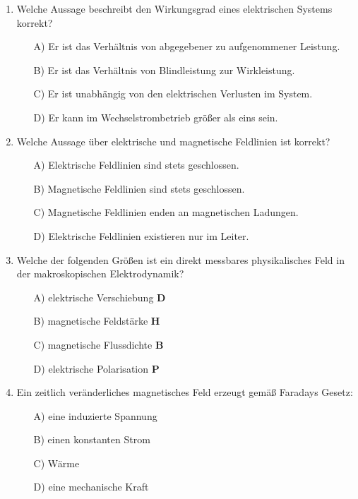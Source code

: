 \documentclass[a4paper,12pt]{article}
\newif\ifshowsolutions
\begin{document}
\begin{enumerate}[label=\textbf{\arabic*.}, leftmargin=*, itemsep=8pt]
\ifshowsolutions
Lösung: B
\fi

  \item Welche Aussage beschreibt den Wirkungsgrad eines elektrischen Systems korrekt?
    \begin{itemize}[label=$\square$]
      \item[A)] Er ist das Verhältnis von abgegebener zu aufgenommener Leistung.
      \item[B)] Er ist das Verhältnis von Blindleistung zur Wirkleistung.
      \item[C)] Er ist unabhängig von den elektrischen Verlusten im System.
      \item[D)] Er kann im Wechselstrombetrieb größer als eins sein.
    \end{itemize}

\ifshowsolutions
Lösung: A
\fi

  \item Welche Aussage über elektrische und magnetische Feldlinien ist korrekt?
    \begin{itemize}[label=$\square$]
      \item[A)] Elektrische Feldlinien sind stets geschlossen.
      \item[B)] Magnetische Feldlinien sind stets geschlossen.
      \item[C)] Magnetische Feldlinien enden an magnetischen Ladungen.
      \item[D)] Elektrische Feldlinien existieren nur im Leiter.
    \end{itemize}

\ifshowsolutions
Lösung: B
\fi

  \item Welche der folgenden Größen ist ein direkt messbares physikalisches Feld in der makroskopischen Elektrodynamik?
    \begin{itemize}[label=$\square$]
      \item[A)] elektrische Verschiebung \(\mathbf{D}\)
      \item[B)] magnetische Feldstärke \(\mathbf{H}\)
      \item[C)] magnetische Flussdichte \(\mathbf{B}\)
      \item[D)] elektrische Polarisation \(\mathbf{P}\)
    \end{itemize}

\ifshowsolutions
Lösung: C
\fi

  \item Ein zeitlich veränderliches magnetisches Feld erzeugt gemäß Faradays Gesetz:
    \begin{itemize}[label=$\square$]
      \item[A)] eine induzierte Spannung
      \item[B)] einen konstanten Strom
      \item[C)] Wärme
      \item[D)] eine mechanische Kraft
    \end{itemize}


\end{enumerate}
\end{document}
